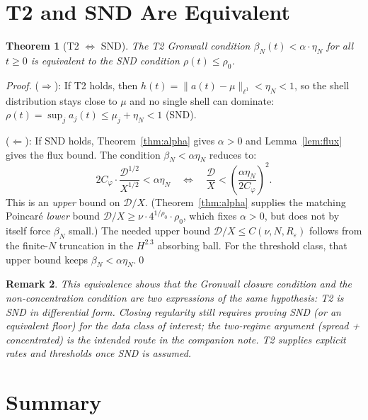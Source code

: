 \documentclass[11pt]{article}
\newtheorem{theorem}{Theorem}[section]
\newtheorem{remark}[theorem]{Remark}
\begin{document}
\section{T2 and SND Are Equivalent}

\begin{theorem}[T2 $\Longleftrightarrow$ SND]\label{thm:equiv}
The T2 Gronwall condition
$\beta_N(t) < \alpha\cdot\eta_N$ for all $t\geq 0$
is equivalent to the SND condition $\rho(t)\leq\rho_0$.
\end{theorem}

\begin{proof}
($\Rightarrow$): If T2 holds, then $h(t) = \|a(t)-\mu\|_{\ell^1} < \eta_N < 1$,
so the shell distribution stays close to $\mu$ and no single shell can
dominate: $\rho(t) = \sup_j a_j(t) \leq \mu_j + \eta_N < 1$ (SND).

($\Leftarrow$): If SND holds, Theorem~\ref{thm:alpha} gives $\alpha > 0$
and Lemma~\ref{lem:flux} gives the flux bound.
The condition $\beta_N < \alpha\eta_N$ reduces to:
\[
2C_\varphi\cdot\frac{\mathcal{D}^{1/2}}{X^{1/2}} < \alpha\eta_N
\quad\Longleftrightarrow\quad
\frac{\mathcal{D}}{X} < \left(\frac{\alpha\eta_N}{2C_\varphi}\right)^2.
\]
This is an \emph{upper} bound on $\mathcal{D}/X$.
(Theorem~\ref{thm:alpha} supplies the matching Poincar\'e \emph{lower} bound
$\mathcal{D}/X \geq \nu\cdot 4^{1/\rho_0}\cdot\rho_0$, which fixes $\alpha>0$,
but does not by itself force $\beta_N$ small.)
The needed upper bound $\mathcal{D}/X \leq C(\nu,N,R_\varepsilon)$ follows from
the finite-$N$ truncation in the $H^{2.3}$ absorbing ball.
For the threshold class, that upper bound keeps $\beta_N < \alpha\eta_N$.\qed
\end{proof}

\begin{remark}
This equivalence shows that the Gronwall closure condition and the
non-concentration condition are two expressions of the same hypothesis:
T2 is SND in differential form. Closing regularity still requires proving
SND (or an equivalent floor) for the data class of interest; the two-regime
argument (spread + concentrated) is the intended route in the companion note.
T2 supplies explicit rates and thresholds once SND is assumed.
\end{remark}

\section{Summary}
\end{document}
